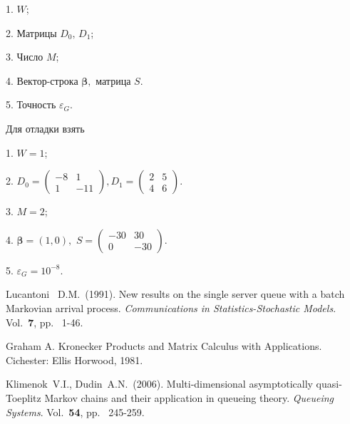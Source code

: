 \documentclass[12pt,a4paper]{article}
\newcommand{\bs}{\boldsymbol}
\begin{document}
1. $W$;

2. Матрицы $D_0,\, D_1$;

3. Число $M$;

4. Вектор-строка  $\bs \beta, $ матрица $S$.

5. Точность $\varepsilon_G.$


\vspace{1cm}

Для отладки взять

1. $W=1$;

2. $ D_0 = \left(\begin{array}{cc}
     -8 & 1 \\
     1 & -11
    \end{array}\right),
    D_1= \left(\begin{array}{cc}
     2 & 5 \\
     4 & 6
    \end{array}\right).$

3.  $M=2$;

4. $\bs \beta=(1,0), $ $S= \left(\begin{array}{cc}
     -30 & 30 \\
     0 & -30
    \end{array}\right)$.

5. $\varepsilon_G=10^{-8}.$



\begin{thebibliography}{99}

  Lucantoni~ D.M.~(1991).  New results on the single server
queue with a batch Markovian arrival process.  {\sl Communications in
Statistics-Stochastic Models}. Vol.~{\bf 7}, pp.~ 1-46.


 Graham A.  Kronecker Products and Matrix Calculus with
 Applications.  Cichester:
Ellis  Horwood, 1981.

 Klimenok~V.I.,   Dudin~A.N.~(2006).  Multi-dimensional asymptotically quasi-Toeplitz
Markov chains and their application in queueing theory. {\sl  Queueing Systems}. Vol.~{\bf 54}, pp.~ 245-259.




 \end{thebibliography}







\end{document}
